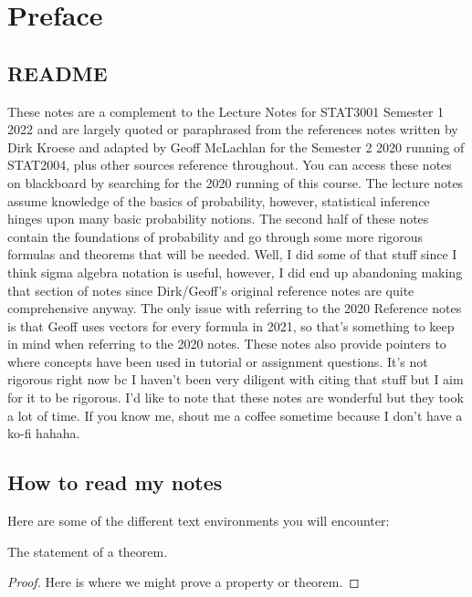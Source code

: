 \chapter*{Preface}

\section*{README}

These notes are a complement to the Lecture Notes for STAT3001 
Semester 1 2022 and are largely quoted or paraphrased from 
the references notes written by Dirk Kroese and adapted by Geoff McLachlan 
for the Semester 2 2020 running of STAT2004, plus other sources reference throughout. 
You can access these notes on blackboard by searching for the 2020 running of this course. 
\bigskip
The lecture notes assume knowledge of the basics of probability, 
however, statistical inference hinges upon many basic 
probability notions. The second half of these notes contain the foundations 
of probability and go through some more rigorous formulas 
and theorems that will be needed. 
Well, I did some of that stuff since I think sigma algebra notation is useful, however, 
I did end up abandoning making that section of notes 
since Dirk/Geoff's original reference notes are quite comprehensive anyway. 
The only issue with referring to the 2020 Reference notes is that Geoff uses vectors for every formula in 2021, so that's something to keep in mind when referring to the 2020 notes. 
\bigskip
These notes also provide pointers to where concepts have been used in tutorial or assignment questions. 
It's not rigorous right now bc I haven't been very diligent with citing that stuff but I aim for it to be rigorous. 
\bigskip
I'd like to note that these notes are wonderful but they 
took a lot of time. 
If you know me, shout me a coffee sometime because I don't have a ko-fi hahaha. 

\section*{How to read my notes}

Here are some of the different text environments you will encounter:
\begin{theorem}
    The statement of a theorem. 
\end{theorem}

\begin{proof}%
    Here is where we might prove a property or theorem. 
\end{proof}


